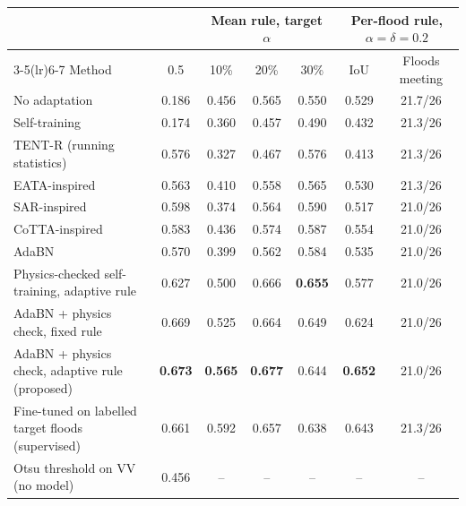 \begin{tabular}{lcccccc}
\toprule
 & & \multicolumn{3}{c}{Mean rule, target $\alpha$} & \multicolumn{2}{c}{Per-flood rule, $\alpha=\delta=0.2$} \\
\cmidrule(lr){3-5}\cmidrule(lr){6-7}
Method & 0.5 & 10\% & 20\% & 30\% & IoU & Floods meeting \\
\midrule
No adaptation & 0.186 & 0.456 & 0.565 & 0.550 & 0.529 & 21.7/26 \\
Self-training \citep{chen2026cimttda} & 0.174 & 0.360 & 0.457 & 0.490 & 0.432 & 21.3/26 \\
TENT-R (running statistics) & 0.576 & 0.327 & 0.467 & 0.576 & 0.413 & 21.3/26 \\
EATA-inspired & 0.563 & 0.410 & 0.558 & 0.565 & 0.530 & 21.3/26 \\
SAR-inspired & 0.598 & 0.374 & 0.564 & 0.590 & 0.517 & 21.0/26 \\
CoTTA-inspired & 0.583 & 0.436 & 0.574 & 0.587 & 0.554 & 21.0/26 \\
AdaBN & 0.570 & 0.399 & 0.562 & 0.584 & 0.535 & 21.0/26 \\
Physics-checked self-training, adaptive rule & 0.627 & 0.500 & 0.666 & \textbf{0.655} & 0.577 & 21.0/26 \\
AdaBN + physics check, fixed rule & 0.669 & 0.525 & 0.664 & 0.649 & 0.624 & 21.0/26 \\
AdaBN + physics check, adaptive rule (proposed) & \textbf{0.673} & \textbf{0.565} & \textbf{0.677} & 0.644 & \textbf{0.652} & 21.0/26 \\
\midrule
Fine-tuned on labelled target floods (supervised) & 0.661 & 0.592 & 0.657 & 0.638 & 0.643 & 21.3/26 \\
\midrule
Otsu threshold on VV (no model) & 0.456 & -- & -- & -- & -- & -- \\
\bottomrule
\end{tabular}
